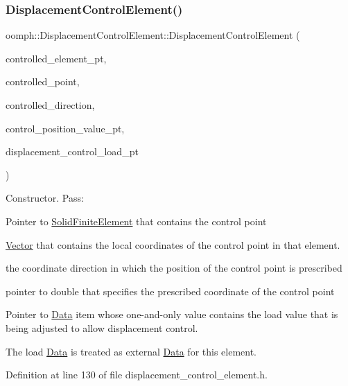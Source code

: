 \subsubsection{\texorpdfstring{Displacement\+Control\+Element()}{DisplacementControlElement()}\hspace{0.1cm}{\footnotesize\ttfamily [1/3]}}
{\footnotesize\ttfamily oomph\+::\+Displacement\+Control\+Element\+::\+Displacement\+Control\+Element (\begin{DoxyParamCaption}\item[{\hyperlink{classoomph_1_1SolidFiniteElement}{Solid\+Finite\+Element} $\ast$}]{controlled\+\_\+element\+\_\+pt,  }\item[{const \hyperlink{classoomph_1_1Vector}{Vector}$<$ double $>$ \&}]{controlled\+\_\+point,  }\item[{const unsigned \&}]{controlled\+\_\+direction,  }\item[{double $\ast$}]{control\+\_\+position\+\_\+value\+\_\+pt,  }\item[{\hyperlink{classoomph_1_1Data}{Data} $\ast$}]{displacement\+\_\+control\+\_\+load\+\_\+pt }\end{DoxyParamCaption})\hspace{0.3cm}{\ttfamily [inline]}}



Constructor. Pass\+: 


\begin{DoxyItemize}
\item Pointer to {\ttfamily \hyperlink{classoomph_1_1SolidFiniteElement}{Solid\+Finite\+Element}} that contains the control point
\item \hyperlink{classoomph_1_1Vector}{Vector} that contains the local coordinates of the control point in that element.
\item the coordinate direction in which the position of the control point is prescribed
\item pointer to double that specifies the prescribed coordinate of the control point
\item Pointer to \hyperlink{classoomph_1_1Data}{Data} item whose one-\/and-\/only value contains the load value that is being adjusted to allow displacement control.
\end{DoxyItemize}The load {\ttfamily \hyperlink{classoomph_1_1Data}{Data}} is treated as external {\ttfamily \hyperlink{classoomph_1_1Data}{Data}} for this element. 

Definition at line 130 of file displacement\+\_\+control\+\_\+element.\+h.



